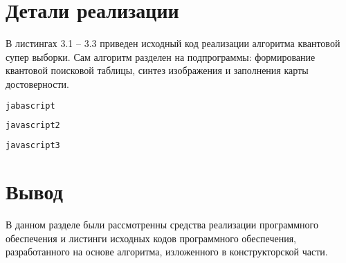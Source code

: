 \section{Детали реализации}

В листингах 3.1 -- 3.3 приведен исходный код реализации алгоритма квантовой супер выборки. Сам алгоритм разделен на подпрограммы: формирование квантовой поисковой таблицы, синтез изображения и заполнения карты достоверности. 


\begin{lstlisting}[label=qtable,caption=Функция формирования квантовой поисковой таблицы, language=javascript]
jabascript
\end{lstlisting}

\begin{lstlisting}[label=synt,caption=Функция синтеза изображения на основе значений поисковой таблицы, language=javascript]
javascript2
\end{lstlisting}

\begin{lstlisting}[label=qfind,caption=Функция заполнения карты достоверности, language=javascript]
javascript3
\end{lstlisting}

\section*{Вывод}

В данном разделе были рассмотренны средства реализации программного обеспечения и листинги исходных кодов программного обеспечения, разработанного на основе алгоритма, изложенного в конструкторской части.
